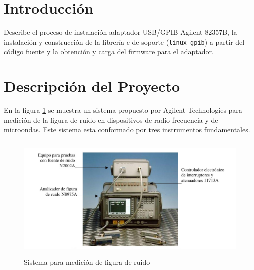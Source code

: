 \documentclass[paper=letter,oneside,fontsize=12pt, parskip=full]{article}
\begin{document}
	\clearpage
	
	\tableofcontents
		
	\section{Introducción}
		Describe el proceso de instalación adaptador USB/GPIB Agilent 82357B, la instalación y construcción de la librería c de soporte (\texttt{linux-gpib}) a partir del código fuente y la obtención y carga del firmware para el adaptador.
		
	\section{Descripción del Proyecto}
	
	En la figura \ref{Fig:SistemaMedicionFiguraRuido} se muestra un sistema propuesto por Agilent Technologies para medición de la figura de ruido en dispositivos de radio frecuencia y de microondas. Este sistema esta conformado por tres instrumentos fundamentales.
	
	\begin{figure}[!h]
		\begin{center}
			\includegraphics[height=6cm]{Imagenes/SistemaMedicionFiguraRuido.pdf}
			\caption{Sistema para medición de figura de ruido}
			\label{Fig:SistemaMedicionFiguraRuido}
		\end{center}	
	\end{figure}	
	
\end{document}
